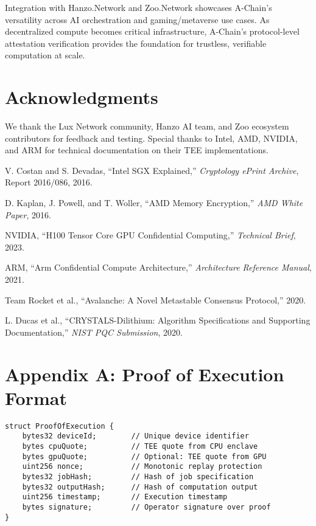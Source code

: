 \documentclass[11pt,a4paper]{article}
\begin{document}
Integration with Hanzo.Network and Zoo.Network showcases A-Chain's versatility across AI orchestration and gaming/metaverse use cases. As decentralized compute becomes critical infrastructure, A-Chain's protocol-level attestation verification provides the foundation for trustless, verifiable computation at scale.

\section*{Acknowledgments}

We thank the Lux Network community, Hanzo AI team, and Zoo ecosystem contributors for feedback and testing. Special thanks to Intel, AMD, NVIDIA, and ARM for technical documentation on their TEE implementations.


\begin{thebibliography}{99}

V. Costan and S. Devadas, ``Intel SGX Explained,'' \textit{Cryptology ePrint Archive}, Report 2016/086, 2016.

D. Kaplan, J. Powell, and T. Woller, ``AMD Memory Encryption,'' \textit{AMD White Paper}, 2016.

NVIDIA, ``H100 Tensor Core GPU Confidential Computing,'' \textit{Technical Brief}, 2023.

ARM, ``Arm Confidential Compute Architecture,'' \textit{Architecture Reference Manual}, 2021.

Team Rocket et al., ``Avalanche: A Novel Metastable Consensus Protocol,'' 2020.

L. Ducas et al., ``CRYSTALS-Dilithium: Algorithm Specifications and Supporting Documentation,'' \textit{NIST PQC Submission}, 2020.

\end{thebibliography}

\appendix

\section{Appendix A: Proof of Execution Format}

\begin{lstlisting}[language=Solidity, basicstyle=\footnotesize\ttfamily]
struct ProofOfExecution {
    bytes32 deviceId;        // Unique device identifier
    bytes cpuQuote;          // TEE quote from CPU enclave
    bytes gpuQuote;          // Optional: TEE quote from GPU
    uint256 nonce;           // Monotonic replay protection
    bytes32 jobHash;         // Hash of job specification
    bytes32 outputHash;      // Hash of computation output
    uint256 timestamp;       // Execution timestamp
    bytes signature;         // Operator signature over proof
}
\end{lstlisting}
\end{document}
